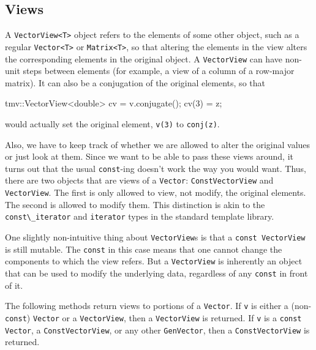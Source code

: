 \documentclass[twoside,letterpaper,11pt]{article}
\renewcommand{\tt}[1]{{\lstinline {#1}}}
\begin{document}
\subsection{Views}
\label{Vector_Views}

A \tt{VectorView<T>} object refers to the elements of some other object, such as a regular
\tt{Vector<T>} or \tt{Matrix<T>},
so that altering the elements in the view alters the
corresponding elements in the original object.  A \tt{VectorView}
can have non-unit
steps between elements (for example, a view of a column of a row-major
matrix).  It can also be a conjugation of the original
elements, so that
\begin{tmvcode}
tmv::VectorView<double> cv = v.conjugate();
cv(3) = z;
\end{tmvcode}
would actually set the original element, \tt{v(3)} to \tt{conj(z)}. 

Also, we have to 
keep track of whether we are allowed to alter the original values or
just look at them.  
Since we want to be able to pass these views around, it turns out that
the usual \tt{const}-ing doesn't work the way you would want.
Thus, there are two objects that are views of a
\tt{Vector}:
\tt{ConstVectorView} and \tt{VectorView}.  
The first is only allowed to view,
not modify, the original elements.  The second is allowed to modify them.
This distinction is akin to the \tt{const\_iterator} and \tt{iterator} types in the
standard template library.

One slightly non-intuitive thing about \tt{VectorView}s is that a 
\tt{const VectorView} is still mutable.  The \tt{const} in this case
means that one cannot change the components to which the view refers.
But a \tt{VectorView} is inherently an object that can be used to 
modify the underlying data, regardless of any \tt{const} in front of it.

The following methods return views to portions of a \tt{Vector}.
If \tt{v} is either a (non-\tt{const}) \tt{Vector}
or a \tt{VectorView}, then a \tt{VectorView} is returned.
If \tt{v} is a \tt{const Vector}, a \tt{ConstVectorView}, or any other \tt{GenVector},
then a \tt{ConstVectorView} is returned.  
\end{document}
